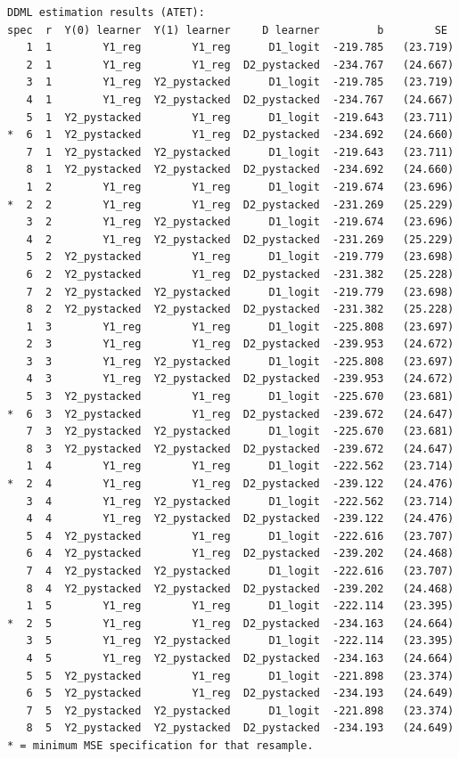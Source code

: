 \documentclass[
]{book}
\begin{document}
\begin{verbatim}
DDML estimation results (ATET):
spec  r  Y(0) learner  Y(1) learner     D learner         b        SE 
   1  1        Y1_reg        Y1_reg      D1_logit  -219.785   (23.719)
   2  1        Y1_reg        Y1_reg  D2_pystacked  -234.767   (24.667)
   3  1        Y1_reg  Y2_pystacked      D1_logit  -219.785   (23.719)
   4  1        Y1_reg  Y2_pystacked  D2_pystacked  -234.767   (24.667)
   5  1  Y2_pystacked        Y1_reg      D1_logit  -219.643   (23.711)
*  6  1  Y2_pystacked        Y1_reg  D2_pystacked  -234.692   (24.660)
   7  1  Y2_pystacked  Y2_pystacked      D1_logit  -219.643   (23.711)
   8  1  Y2_pystacked  Y2_pystacked  D2_pystacked  -234.692   (24.660)
   1  2        Y1_reg        Y1_reg      D1_logit  -219.674   (23.696)
*  2  2        Y1_reg        Y1_reg  D2_pystacked  -231.269   (25.229)
   3  2        Y1_reg  Y2_pystacked      D1_logit  -219.674   (23.696)
   4  2        Y1_reg  Y2_pystacked  D2_pystacked  -231.269   (25.229)
   5  2  Y2_pystacked        Y1_reg      D1_logit  -219.779   (23.698)
   6  2  Y2_pystacked        Y1_reg  D2_pystacked  -231.382   (25.228)
   7  2  Y2_pystacked  Y2_pystacked      D1_logit  -219.779   (23.698)
   8  2  Y2_pystacked  Y2_pystacked  D2_pystacked  -231.382   (25.228)
   1  3        Y1_reg        Y1_reg      D1_logit  -225.808   (23.697)
   2  3        Y1_reg        Y1_reg  D2_pystacked  -239.953   (24.672)
   3  3        Y1_reg  Y2_pystacked      D1_logit  -225.808   (23.697)
   4  3        Y1_reg  Y2_pystacked  D2_pystacked  -239.953   (24.672)
   5  3  Y2_pystacked        Y1_reg      D1_logit  -225.670   (23.681)
*  6  3  Y2_pystacked        Y1_reg  D2_pystacked  -239.672   (24.647)
   7  3  Y2_pystacked  Y2_pystacked      D1_logit  -225.670   (23.681)
   8  3  Y2_pystacked  Y2_pystacked  D2_pystacked  -239.672   (24.647)
   1  4        Y1_reg        Y1_reg      D1_logit  -222.562   (23.714)
*  2  4        Y1_reg        Y1_reg  D2_pystacked  -239.122   (24.476)
   3  4        Y1_reg  Y2_pystacked      D1_logit  -222.562   (23.714)
   4  4        Y1_reg  Y2_pystacked  D2_pystacked  -239.122   (24.476)
   5  4  Y2_pystacked        Y1_reg      D1_logit  -222.616   (23.707)
   6  4  Y2_pystacked        Y1_reg  D2_pystacked  -239.202   (24.468)
   7  4  Y2_pystacked  Y2_pystacked      D1_logit  -222.616   (23.707)
   8  4  Y2_pystacked  Y2_pystacked  D2_pystacked  -239.202   (24.468)
   1  5        Y1_reg        Y1_reg      D1_logit  -222.114   (23.395)
*  2  5        Y1_reg        Y1_reg  D2_pystacked  -234.163   (24.664)
   3  5        Y1_reg  Y2_pystacked      D1_logit  -222.114   (23.395)
   4  5        Y1_reg  Y2_pystacked  D2_pystacked  -234.163   (24.664)
   5  5  Y2_pystacked        Y1_reg      D1_logit  -221.898   (23.374)
   6  5  Y2_pystacked        Y1_reg  D2_pystacked  -234.193   (24.649)
   7  5  Y2_pystacked  Y2_pystacked      D1_logit  -221.898   (23.374)
   8  5  Y2_pystacked  Y2_pystacked  D2_pystacked  -234.193   (24.649)
* = minimum MSE specification for that resample.


\end{verbatim}
\end{document}
